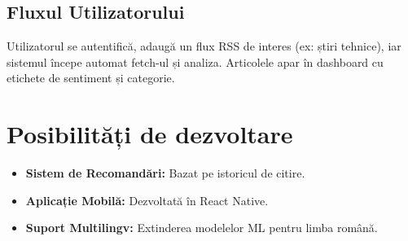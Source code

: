\documentclass[12pt,a4paper]{article}
\begin{document}
	\subsection{Fluxul Utilizatorului}
	Utilizatorul se autentifică, adaugă un flux RSS de interes (ex: știri tehnice), iar sistemul începe automat fetch-ul și analiza. Articolele apar în dashboard cu etichete de sentiment și categorie.
	
	\section{Posibilități de dezvoltare}
	
	\begin{itemize}
		\item \textbf{Sistem de Recomandări:} Bazat pe istoricul de citire.
		\item \textbf{Aplicație Mobilă:} Dezvoltată în React Native.
		\item \textbf{Suport Multilingv:} Extinderea modelelor ML pentru limba română.
	\end{itemize}
	
\end{document}
